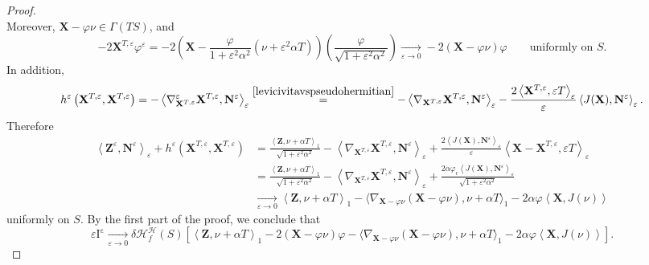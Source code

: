 \documentclass[11pt]{amsart}
\newcommand{\hhh}{{\mathcal{H}}}
\newcommand{\n}[1]{\nabla^\varepsilon_{ #1 }}
\newcommand{\tmc}{{\mathscr{H}}}
\newcommand{\vh}{\nu}
\newcommand{\eps}{\varepsilon}
\newcommand{\X}{\mathbf{X}}
\newcommand{\Z}{\mathbf{Z}}
\renewcommand{\n}{\mathbf{N}}
\theoremstyle{definition}
\theoremstyle{remark}
\numberwithin{equation}{section}
\begin{document}
\begin{proof}
\begin{equation*}
    \end{equation*}
    Moreover, $\X-\varphi\vh\in\Gamma(TS)$, and 
    \begin{equation*}
        -2\X^{T,\eps}\varphi^\eps=-2\left(\X-\frac{\varphi}{1+\eps^2\alpha^2}\left(\vh+\eps^2\alpha T\right)\right)\left(\frac{\varphi}{\sqrt{1+\eps^2\alpha^2}}\right)\xrightarrow[\eps\to 0]{}-2\left(\X-\varphi\vh\right)\varphi\qquad\text{uniformly on $S$}.
    \end{equation*}
    In addition,
    \begin{equation*}
        h^\eps\left(\X^{T,\eps},\X^{T,\eps}\right)=-\left\langle\nabla^\eps_{\X^{T,\eps}}\X^{T,\eps},\n^\eps\right\rangle_\eps\overset{\eqref{levicivitavspseudohermitian}}{=}-\left\langle\nabla_{\X^{T,\eps}}\X^{T,\eps},\n^\eps\right\rangle_\eps-\frac{2\left\langle\X^{T,\eps},\eps T\right\rangle_\eps}{\eps}\left\langle J(\X),\n^\eps\right\rangle_\eps.
    \end{equation*}
Therefore
\begin{equation*}
    \begin{split}
        \left\langle\Z^\eps,\n^\eps\right\rangle_\eps+h^\eps\left(\X^{T,\eps},\X^{T,\eps}\right)&=\frac{\left\langle\Z,\vh+\alpha T\right\rangle_1}{\sqrt{1+\eps^2\alpha^2}}-\left\langle\nabla_{\X^{T,\eps}}\X^{T,\eps},\n^\eps\right\rangle_\eps+\frac{2\left\langle J(\X),\n^\eps\right\rangle_\eps}{\eps}\left\langle\X-\X^{T,\eps},\eps T\right\rangle_\eps\\
        &=\frac{\left\langle\Z,\vh+\alpha T\right\rangle_1}{\sqrt{1+\eps^2\alpha^2}}-\left\langle\nabla_{\X^{T,\eps}}\X^{T,\eps},\n^\eps\right\rangle_\eps+\frac{2\alpha\varphi_\epsilon\left\langle J(\X),\n^\eps\right\rangle_\eps}{\sqrt{1+\eps^2\alpha^2}}\\
        &\xrightarrow[\eps\to 0]{}\left\langle\Z,\vh+\alpha T\right\rangle_1-\Big\langle\nabla_{\X-\varphi\vh}\left(\X-\varphi\vh\right),\vh+\alpha T\Big\rangle_1-2\alpha\varphi\left\langle \X,J(\vh)\right\rangle
    \end{split}
\end{equation*}
uniformly on $S$. By the first part of the proof, we conclude that 
    \begin{equation*}
        \eps\mathrm{I^\eps}\xrightarrow[\eps\to 0]{}\delta\tmc^\hhh_f(S)\left[\left\langle\Z,\vh+\alpha T\right\rangle_1-2\left(\X-\varphi\vh\right)\varphi-\Big\langle\nabla_{\X-\varphi\vh}\left(\X-\varphi\vh\right),\vh+\alpha T\Big\rangle_1-2\alpha\varphi\left\langle \X,J(\vh)\right\rangle\right].
    \end{equation*}

\end{proof}
\end{document}
